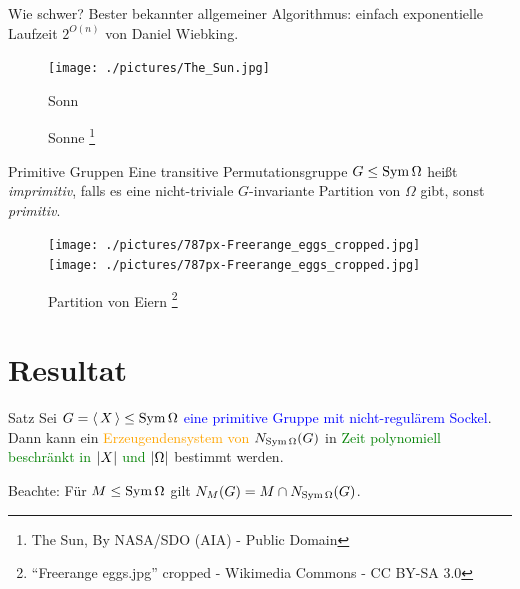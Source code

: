 \begin{frame}{Wie schwer?}
Bester bekannter allgemeiner Algorithmus:
einfach exponentielle Laufzeit $2 ^ {O(n)}$ von Daniel Wiebking.

\pause
\begin{figure}[h]
\centering
\texttt{[image: ./pictures/The\_Sun.jpg]}
\caption{Sonne%
\footnote{The Sun, By NASA/SDO (AIA) - Public Domain}
}{Sonn}
\end{figure}
\end{frame}


\begin{frame}{Primitive Gruppen}
\pause
Eine transitive Permutationsgruppe $G \leq \operatorname{Sym} \Omega$ heißt
\emph{imprimitiv},
\pause
falls es eine nicht-triviale
$G$-invariante Partition von $\Omega$ gibt,
\pause
sonst \emph{primitiv}.

\pause
\begin{figure}[h]
\centering
\texttt{[image: ./pictures/787px-Freerange\_eggs\_cropped.jpg]}
~
\texttt{[image: ./pictures/787px-Freerange\_eggs\_cropped.jpg]}
\caption{Partition von Eiern%
\footnote{``Freerange eggs.jpg'' cropped - Wikimedia Commons - CC BY-SA 3.0}
}
\end{figure}
\end{frame}


\section{Resultat}
\begin{frame}%
\begin{block}{Satz}
Sei \textcolor{blue}{$G =  \left\langle \, X \, \right\rangle  \leq \operatorname{Sym} \Omega$ eine primitive Gruppe
mit nicht-regulärem Sockel}.
\pause
Dann kann ein
\textcolor{orange}{Erzeugendensystem von $N_{\operatorname{Sym} \Omega}(G)$}
\pause
in
\textcolor{green}{Zeit polynomiell beschränkt in $ \left| X \right| $ und $ \left| \Omega \right| $} bestimmt werden.
\end{block}
\vspace{1.5em}
\pause
Beachte: Für $M \leq \operatorname{Sym} \Omega$ gilt
$N_{M}(G) = M \cap N_{\operatorname{Sym} \Omega}(G)$.
\end{frame}


